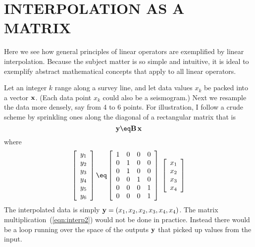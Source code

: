 \section{INTERPOLATION AS A MATRIX}
Here we see how general principles of linear operators
are exemplified by linear interpolation.
Because the subject matter is so simple and intuitive,
it is ideal to exemplify abstract mathematical concepts
that apply to all linear operators.
\par
Let an integer $k$ range along a survey line,
and let data values $x_k$ be packed into a vector $\bold x$.
(Each data point $x_k$ could also be a seismogram.)
Next we resample the data more densely,
say from 4 to 6 points.
For illustration, I follow a crude
scheme by sprinkling ones along the diagonal of a rectangular matrix
that is
\begin{equation}
\bold y \eq  \bold B \, \bold x
\label{eqn:interp1}
\end{equation}
where
\begin{equation}
 \left[ 
  \begin{array}{c}
   y_1 \\ 
   y_2 \\
   y_3 \\
   y_4 \\
   y_5 \\
   y_6
  \end{array}
 \right] 
\eq
 \left[ 
  \begin{array}{cccc}
  1 & 0 & 0 & 0 \\
  0 & 1 & 0 & 0 \\
  0 & 1 & 0 & 0 \\
  0 & 0 & 1 & 0 \\
  0 & 0 & 0 & 1 \\
  0 & 0 & 0 & 1
  \end{array}
 \right] \;
 \left[ 
  \begin{array}{c}
   x_1 \\ 
   x_2 \\
   x_3 \\
   x_4
  \end{array}
 \right] 
\label{eqn:interp2}
\end{equation}
The interpolated data is simply
$\bold y = (x_1, x_2,x_2,x_3, x_4,x_4)$.
The matrix multiplication~(\ref{eqn:interp2})
would not be done in practice.
Instead there would be a loop running over the space of the
outputs $\bold y$ that picked up values from the input.

